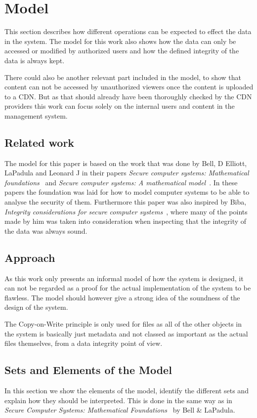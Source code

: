 \documentclass[a4paper,12pt]{article}
\begin{document}
\section{Model} \label{sec:model}
This section describes how different operations can be expected to effect the data in the system.
The model for this work also shows how the data can only be accessed or modified by
authorized users and how the defined integrity of the data is always kept. 

There could also be another relevant part included in the model, to show that content can not be 
accessed by unauthorized viewers once the content is uploaded to a CDN. But as that should already 
have been thoroughly checked by the CDN providers this work can focus solely on the internal users 
and content in the management system. 

\subsection{Related work}
The model for this paper is based on the work that was done by Bell, D Elliott, LaPadula and 
Leonard J in their papers \textit{Secure computer systems: Mathematical foundations}~\cite{BLP1} 
and \textit{Secure computer systems: A mathematical model}~\cite{BLP2}. 
In these papers the foundation was laid for how to model computer systems to be able to analyse 
the security of them. Furthermore this paper was also inspired by Biba, \textit{Integrity 
considerations for secure computer systems}~\cite{BIBA}, where many of the points made by him was 
taken into consideration when inspecting that the integrity of the data was always sound.

\subsection{Approach}
As this work only presents an informal model of how the system is designed, it can not be regarded as
a proof for the actual implementation of the system to be flawless. The model should however give a 
strong idea of the soundness of the design of the system.

The Copy-on-Write principle is only used for files as all of the other objects in the system is
basically just metadata and not classed as important as the actual files themselves, from a data
integrity point of view.

\subsection{Sets and Elements of the Model}\label{sec:elements}
In this section we show the elements of the model, identify the different sets and explain how they
should be interpreted. This is done in the same way as in \textit{Secure Computer Systems: Mathematical
Foundations}~\cite{BLP1} by Bell \& LaPadula.
\end{document}
